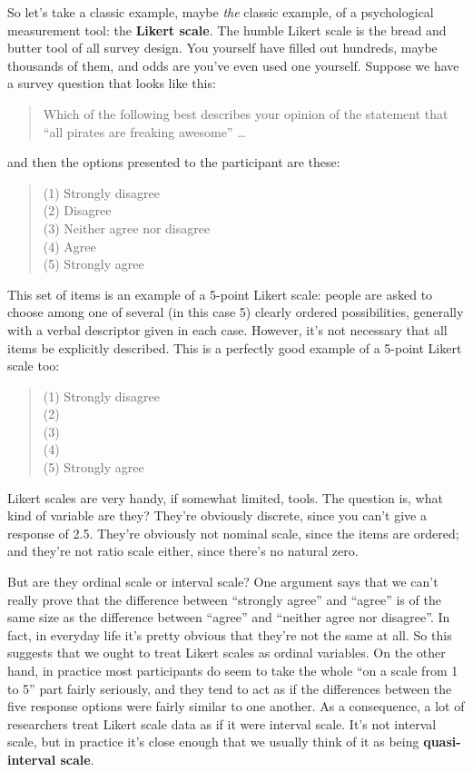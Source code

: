 \documentclass[]{book}
\begin{document}
So let's take a classic example, maybe {\emph{the}} classic example, of a psychological measurement tool: the \textbf{Likert scale}. The humble Likert scale is the bread and butter tool of all survey design. You yourself have filled out hundreds, maybe thousands of them, and odds are you've even used one yourself. Suppose we have a survey question that looks like this:

\begin{quote}
Which of the following best describes your opinion of the statement that ``all pirates are freaking awesome'' \ldots{}
\end{quote}

and then the options presented to the participant are these:

\begin{quote}
(1) Strongly disagree\\
(2) Disagree\\
(3) Neither agree nor disagree\\
(4) Agree\\
(5) Strongly agree
\end{quote}

This set of items is an example of a 5-point Likert scale: people are asked to choose among one of several (in this case 5) clearly ordered possibilities, generally with a verbal descriptor given in each case. However, it's not necessary that all items be explicitly described. This is a perfectly good example of a 5-point Likert scale too:

\begin{quote}
(1) Strongly disagree\\
(2)\\
(3)\\
(4)\\
(5) Strongly agree
\end{quote}

Likert scales are very handy, if somewhat limited, tools. The question is, what kind of variable are they? They're obviously discrete, since you can't give a response of 2.5. They're obviously not nominal scale, since the items are ordered; and they're not ratio scale either, since there's no natural zero.

But are they ordinal scale or interval scale? One argument says that we can't really prove that the difference between ``strongly agree'' and ``agree'' is of the same size as the difference between ``agree'' and ``neither agree nor disagree''. In fact, in everyday life it's pretty obvious that they're not the same at all. So this suggests that we ought to treat Likert scales as ordinal variables. On the other hand, in practice most participants do seem to take the whole ``on a scale from 1 to 5'' part fairly seriously, and they tend to act as if the differences between the five response options were fairly similar to one another. As a consequence, a lot of researchers treat Likert scale data as if it were interval scale. It's not interval scale, but in practice it's close enough that we usually think of it as being \textbf{quasi-interval scale}.
\end{document}
